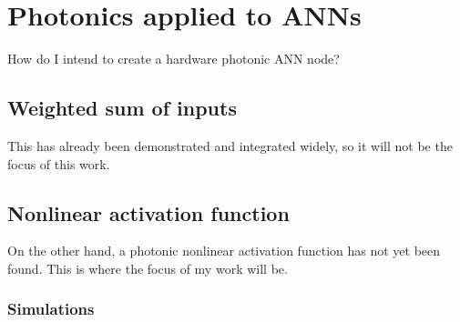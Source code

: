 \chapter{Photonics applied to ANNs}

How do I intend to create a hardware photonic ANN node?
\section{Weighted sum of inputs}
This has already been demonstrated and integrated widely, so it will not be the focus of this work.
\section{Nonlinear activation function}
On the other hand, a photonic nonlinear activation function has not yet been found.
This is where the focus of my work will be.

\subsection{Simulations}
